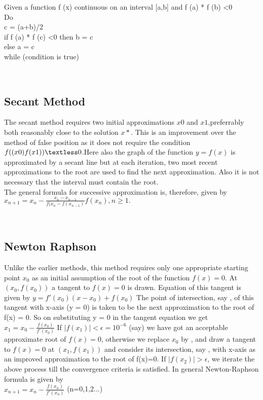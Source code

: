 \noindent Given a function f (x) continuous on an interval [a,b] and f (a) * f (b) \textless 0\\
	Do\\ 
	c = (a+b)/2 \\
	if f (a) * f (c) \textless 0 then  b = c \\
	else  a = c \\
	while (condition is true)

\
\
\

\subsection{Secant Method}
The secant method requires two initial approximations $x0$ and $x1$,preferrably both reasonably close to the solution $x*$. This is an improvement over the method of false position as it does not require the condition $f((x0) f(x1))\textless 0$.Here also the graph of the function $y=f(x)$ is approximated by a secant line but at each iteration, two most recent approximations to the root are used to find the next approximation. Also it is not necessary that the interval must contain the root.\\
The general formula for successive approximation is, therefore, given by\\
$x_{n+1}=x_{n}-{\frac{x_{n} -x_{n-1}}{f(x_{n}-f(x_{n-1})}}f(x_{n}),n \geq 1.$




\
\
\

\subsection{Newton Raphson}
Unlike the earlier methods, this method requires only one appropriate starting point $ x_{0}$ as an initial assumption of the root of the function $ f(x)=0$. At $ (x_{0},f(x_{0}))$ a tangent to $ f(x)=0$ is drawn. Equation of this tangent is given by $\displaystyle y=f'(x_{0})(x-x_{0})+f(x_{0})$ 
The point of intersection, say , of this tangent with x-axis (y = 0) is taken to be the next approximation to the root of f(x) = 0. So on substituting y = 0 in the tangent equation we get
$\displaystyle x_{1}=x_{0}-\frac{f(x_{0})}{f'(x_{0})}$ 
If $ \vert f(x_{1})\vert < \epsilon=10^{-6}$ (say) we have got an acceptable approximate root of $ f(x)=0$, otherwise we replace $ x_{0}$ by , and draw a tangent to $ f(x)=0$ at $ (x_{1},f(x_{1}))$ and consider its intersection, say , with x-axis as an improved approximation to the root of f(x)=0. If $ \vert f(x_{2})\vert>\epsilon$, we iterate the above process till the convergence criteria is satisfied.
In general Newton-Raphson formula is given by\\
$x_{n+1}=x_{n}-\frac{f(x_{n})}{f'(x_{n})}$ (n=0,1,2...)


